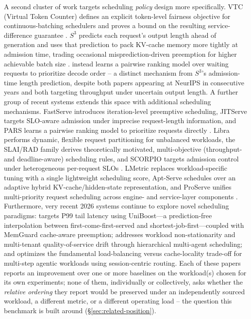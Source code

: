 A second cluster of work targets scheduling \emph{policy} design more
specifically. VTC (Virtual Token Counter) defines an explicit token-level
fairness objective for continuous-batching schedulers and proves a bound on
the resulting service-difference guarantee \citep{sheng2024vtc}. $S^3$
predicts each request's output length ahead of generation and uses that
prediction to pack KV-cache memory more tightly at admission time, trading
occasional misprediction-driven preemption for higher achievable batch size
\citep{jin2023s3}. \citet{efficientllmscheduling2024} instead learns a
pairwise ranking model over waiting requests to prioritize decode order --
a distinct mechanism from $S^3$'s admission-time length prediction, despite
both papers appearing at NeurIPS in consecutive years and both targeting
throughput under uncertain output length. A further group of recent systems
extends this space with additional scheduling mechanisms. FastServe
introduces iteration-level preemptive scheduling, JITServe targets
SLO-aware admission under imprecise request-length information, and PARS
learns a pairwise ranking model to prioritize requests directly
\citep{fastserve2024,jitserve2025,pars2025}. Libra performs dynamic,
flexible request partitioning for unbalanced workloads, the SLAI/RAD
family derives theoretically motivated, multi-objective (throughput- and
deadline-aware) scheduling rules, and SCORPIO targets admission control
under heterogeneous per-request SLOs
\citep{libra2026,slai2025,scorpio2025}. LMetric replaces workload-specific
tuning with a single lightweight scheduling score, Apt-Serve schedules
over an adaptive hybrid KV-cache/hidden-state representation, and ProServe
unifies multi-priority request scheduling across engine- and service-layer
components \citep{lmetric2026,aptserve2025,proserve2025}. Furthermore, very
recent 2026 systems continue to explore novel scheduling paradigms:
\citet{li2026beyond} targets P99 tail latency using UniBoost---a prediction-free
interpolation between first-come-first-served and shortest-job-first---coupled
with MemGuard cache-aware preemption; \citet{liu2026hmas} addresses workload
non-stationarity and multi-tenant quality-of-service drift through
hierarchical multi-agent scheduling; and \citet{wang2026smetric} optimizes the
fundamental load-balancing versus cache-locality trade-off for multi-step
agentic workloads using session-centric routing. Each of these
papers reports an improvement over one or more baselines on
the workload(s) chosen for its own experiments; none of them, individually
or collectively, asks whether the \emph{relative ordering} they report would
be preserved under an independently sourced workload, a different metric,
or a different operating load -- the question this benchmark is built
around (\S\ref{sec:related-position}).

